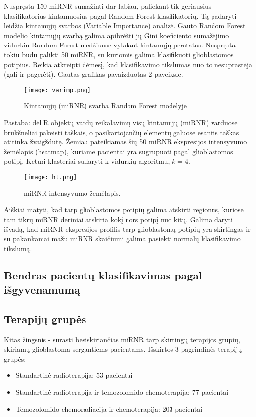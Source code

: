 \documentclass[a4paper,12pt]{article}
\begin{document}
Nuspręsta 150 miRNR sumažinti dar labiau, paliekant tik geriausius klasifikatorius-kintamuosius pagal Random Forest klasifikatorių. Tą padaryti leidžia kintamųjų svarbos (Variable Importance) analizė. Gauto Random Forest modelio kintamųjų svarbą galima apibrėžti jų Gini koeficiento sumažėjimo vidurkiu Random Forest medžiuose vykdant kintamųjų perstatas. Nuspręsta tokiu būdu palikti 50 miRNR, su kuriomis galima klasifikuoti glioblastomos potipius. Reikia atkreipti dėmesį, kad klasifikavimo tikslumas nuo to nesuprastėja (gali ir pagerėti). Gautas grafikas pavaizduotas 2 paveiksle.

\begin{figure}[h]
	\centering
		\texttt{[image: varimp.png]}
	\caption{Kintamųjų (miRNR) svarba Random Forest modelyje }
\end{figure}

Pastaba: dėl R objektų vardų reikalavimų visų kintamųjų (miRNR) varduose brūkšneliai pakeisti taškais, o pasikartojančių elementų galuose esantis taškas atitinka žvaigždutę. Žemiau pateikiamas šių 50 miRNR ekspresijos intensyvumo žemėlapis (heatmap), kuriame pacientai yra sugrupuoti pagal glioblastomos potipį. Keturi klasteriai sudaryti k-vidurkių algoritmu, $k = 4$.

\begin{figure}[h]
	\centering
		\texttt{[image: ht.png]}
	\caption{miRNR intensyvumo žemėlapis.}
\end{figure}

Aiškiai matyti, kad tarp glioblastomos potipių galima atskirti regionus, kuriose tam tikrų miRNR deriniai atskiria kokį nors potipį nuo kitų. Galima daryti išvadą, kad miRNR ekspresijos profilis tarp glioblastomų potipių yra skirtingas ir su pakankamai mažu miRNR skaičiumi galima pasiekti normalų klasifikavimo tikslumą.

\subsection{Bendras pacientų klasifikavimas pagal išgyvenamumą}


\subsection{Terapijų grupės}
Kitas žingsnis - surasti besiskiriančias miRNR tarp skirtingų terapijos grupių, skiriamų glioblastoma sergantiems pacientams. Išskirtos 3 pagrindinės terapijų grupės:
\begin{itemize}
\item{Standartinė radioterapija: 53 pacientai}
\item{Standartinė radioterapija ir temozolomido chemoterapija: 77 pacientai}
\item{Temozolomido chemoradiacija ir chemoterapija: 203 pacientai}
\end{itemize}
\end{document}
